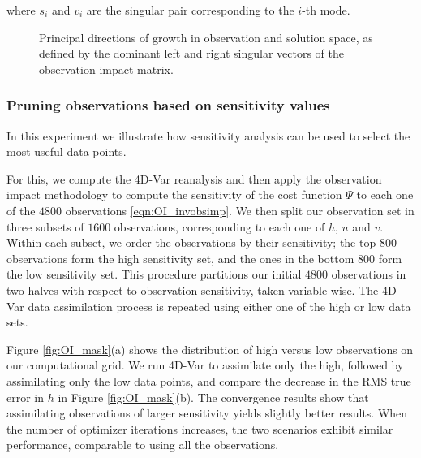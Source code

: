 \documentclass[final,sort&compress]{elsarticle}
\begin{document}
\noindent where $s_i$ and $v_i$ are the singular pair corresponding to the $i$-th mode.
\begin{figure}
 \setcounter{subfigure}{0}
  \centering
  \caption{Principal directions of growth in observation and solution space, as defined by the 
  dominant left and right singular vectors of the observation impact matrix.}
  \label{fig:OI_principaldir}
 \end{figure}


\subsubsection{Pruning observations based on sensitivity values}

In this experiment we illustrate how sensitivity analysis can be used to select the most useful data points.

For this, we compute the 4D-Var reanalysis and then apply the observation impact methodology to compute 
the sensitivity of the cost function $\Psi$ to each one of the $4800$ observations \eqref{eqn:OI_invobsimp}.
We then split our observation set in three subsets of $1600$ observations, corresponding to each one of $h$, $u$ and $v$. 
Within each subset, we order the observations by their sensitivity; the top $800$ observations 
form the {\sc high} sensitivity set, and the ones in the bottom $800$ form the {\sc low} sensitivity set.
This procedure partitions our initial $4800$ observations in two halves with respect to observation sensitivity, taken variable-wise.
The 4D-Var data assimilation process is repeated using either one of the {\sc high} or {\sc low} data sets.

Figure \ref{fig:OI_mask}(a) shows the distribution of {\sc high} versus {\sc low} observations on our computational grid. 
We run 4D-Var to assimilate only the {\sc high}, followed by assimilating only the {\sc low} data points, 
and compare the decrease in the RMS true error in $h$ in Figure \ref{fig:OI_mask}(b). 
The convergence results show that assimilating observations of larger sensitivity yields slightly better results.
When the number of optimizer iterations increases, the two scenarios exhibit
similar performance, comparable to using all the observations.
\end{document}
